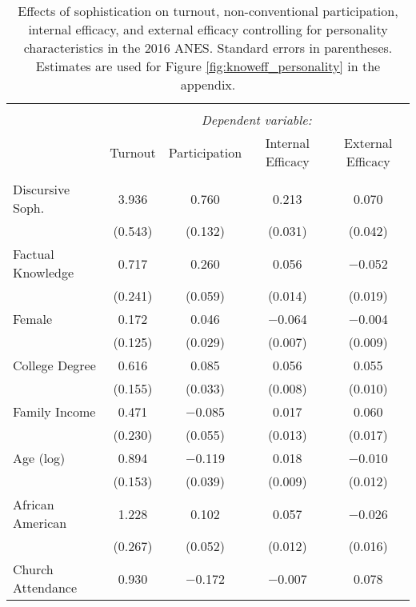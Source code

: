 
\begin{table}[!htbp] \centering 
  \caption[Effects of sophistication on turnout, non-conventional participation, internal efficacy, 
  and external efficacy controlling for personality characteristics in the 2016 ANES]{Effects of sophistication on turnout, non-conventional participation, internal efficacy, 
          and external efficacy controlling for personality characteristics in the 2016 ANES. 
          Standard errors in parentheses. Estimates are used for Figure \ref{fig:knoweff_personality} 
          in the appendix.} 
  \label{tab:knoweff2016_personality} 
\begin{tabular}{@{\extracolsep{0pt}}lcccc} 
\\[-1.8ex]\hline 
\hline \\[-1.8ex] 
 & \multicolumn{4}{c}{\textit{Dependent variable:}} \\ 
\cline{2-5} 
 & Turnout & Participation & Internal Efficacy & External Efficacy \\ 
\hline \\[-1.8ex] 
 Discursive Soph. & 3.936 & 0.760 & 0.213 & 0.070 \\ 
  & (0.543) & (0.132) & (0.031) & (0.042) \\ 
  Factual Knowledge & 0.717 & 0.260 & 0.056 & $-$0.052 \\ 
  & (0.241) & (0.059) & (0.014) & (0.019) \\ 
  Female & 0.172 & 0.046 & $-$0.064 & $-$0.004 \\ 
  & (0.125) & (0.029) & (0.007) & (0.009) \\ 
  College Degree & 0.616 & 0.085 & 0.056 & 0.055 \\ 
  & (0.155) & (0.033) & (0.008) & (0.010) \\ 
  Family Income & 0.471 & $-$0.085 & 0.017 & 0.060 \\ 
  & (0.230) & (0.055) & (0.013) & (0.017) \\ 
  Age (log) & 0.894 & $-$0.119 & 0.018 & $-$0.010 \\ 
  & (0.153) & (0.039) & (0.009) & (0.012) \\ 
  African American & 1.228 & 0.102 & 0.057 & $-$0.026 \\ 
  & (0.267) & (0.052) & (0.012) & (0.016) \\ 
  Church Attendance & 0.930 & $-$0.172 & $-$0.007 & 0.078 \\ 

\end{tabular}
\end{table}
